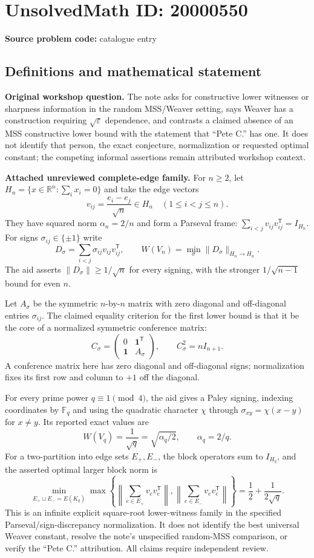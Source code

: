 \documentclass[11pt]{article}
\newcommand{\R}{\mathbb{R}}
\newcommand{\F}{\mathbb{F}}
\newcommand{\eps}{\varepsilon}
\begin{document}
\section*{UnsolvedMath ID: 20000550}
\textbf{Source problem code:} catalogue entry
\subsection{Definitions and mathematical statement}
\textbf{Original workshop question.} The note asks for constructive lower witnesses or sharpness information in the random MSS/Weaver setting, says Weaver has a construction requiring $\sqrt\eps$ dependence, and contrasts a claimed absence of an MSS constructive lower bound with the statement that ``Pete C.'' has one. It does not identify that person, the exact conjecture, normalization or requested optimal constant; the competing informal assertions remain attributed workshop context.

\textbf{Attached unreviewed complete-edge family.} For $n\ge2$, let $H_n=\{x\in\R^n:\sum_i x_i=0\}$ and take the edge vectors
\[v_{ij}=\frac{e_i-e_j}{\sqrt n}\in H_n\quad(1\le i<j\le n).\]
They have squared norm $\alpha_n=2/n$ and form a Parseval frame: $\sum_{i<j}v_{ij}v_{ij}^{\mathsf T}=I_{H_n}$. For signs $\sigma_{ij}\in\{\pm1\}$ write
\[D_\sigma=\sum_{i<j}\sigma_{ij}v_{ij}v_{ij}^{\mathsf T},\qquad W(V_n)=\min_\sigma\|D_\sigma\|_{H_n\to H_n}.\]
The aid asserts $\|D_\sigma\|\ge1/\sqrt n$ for every signing, with the stronger $1/\sqrt{n-1}$ bound for even $n$.

Let $A_\sigma$ be the symmetric $n$-by-$n$ matrix with zero diagonal and off-diagonal entries $\sigma_{ij}$. The claimed equality criterion for the first lower bound is that it be the core of a normalized symmetric conference matrix:
\[C_\sigma=\begin{pmatrix}0&\mathbf1^{\mathsf T}\\\mathbf1&A_\sigma\end{pmatrix},\qquad C_\sigma^2=nI_{n+1}.\]
A conference matrix here has zero diagonal and off-diagonal signs; normalization fixes its first row and column to $+1$ off the diagonal.

For every prime power $q\equiv1\pmod4$, the aid gives a Paley signing, indexing coordinates by $\F_q$ and using the quadratic character $\chi$ through $\sigma_{xy}=\chi(x-y)$ for $x\ne y$. Its reported exact values are
\[W(V_q)=\frac1{\sqrt q}=\sqrt{\alpha_q/2},\qquad\alpha_q=2/q.\]
For a two-partition into edge sets $E_+,E_-$, the block operators sum to $I_{H_q}$, and the asserted optimal larger block norm is
\[\min_{E_+\sqcup E_-=E(K_q)}\max\left\{\left\|\sum_{e\in E_+}v_ev_e^{\mathsf T}\right\|,\left\|\sum_{e\in E_-}v_ev_e^{\mathsf T}\right\|\right\}=\frac12+\frac1{2\sqrt q}.\]
This is an infinite explicit square-root lower-witness family in the specified Parseval/sign-discrepancy normalization. It does not identify the best universal Weaver constant, resolve the note's unspecified random-MSS comparison, or verify the ``Pete C.'' attribution. All claims require independent review.
\end{document}
